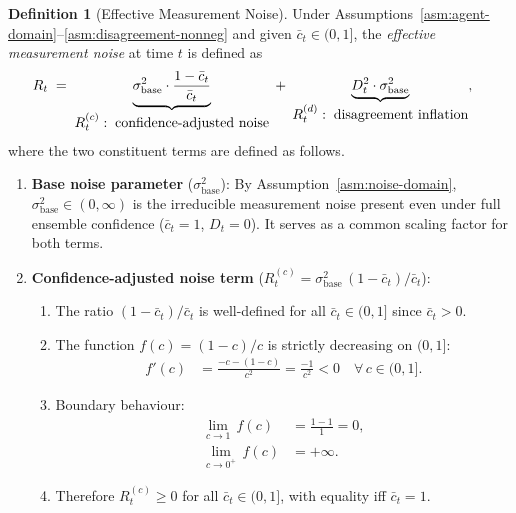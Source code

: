 \documentclass[12pt,openany]{book}
\numberwithin{equation}{chapter}
\theoremstyle{plain}
\theoremstyle{definition}
\newtheorem{definition}[theorem]{Definition}
\theoremstyle{remark}
\begin{document}
\begin{definition}[Effective Measurement Noise]
\label{def:effective-noise}
Under Assumptions~\ref{asm:agent-domain}--\ref{asm:disagreement-nonneg}
and given $\bar{c}_t \in (0, 1]$, the
\emph{effective measurement noise} at time $t$ is defined as
\begin{align}
  R_t
  &\;=\;
  \underbrace{%
    \sigma_{\mathrm{base}}^2
    \cdot
    \frac{1 - \bar{c}_t}{\bar{c}_t}
  }_{\displaystyle R_t^{(c)}:\;\text{confidence-adjusted noise}}
  \;+\;
  \underbrace{%
    D_t^2
    \cdot
    \sigma_{\mathrm{base}}^2
  }_{\displaystyle R_t^{(d)}:\;\text{disagreement inflation}},
  \label{eq:effective-measurement-noise}
\end{align}
where the two constituent terms are defined as follows.
\begin{enumerate}
  \item \textbf{Base noise parameter} ($\sigma_{\mathrm{base}}^2$):
        By Assumption~\ref{asm:noise-domain},
        $\sigma_{\mathrm{base}}^2 \in (0,\infty)$ is the
        irreducible measurement noise present even under full
        ensemble confidence ($\bar{c}_t = 1$, $D_t = 0$).
        It serves as a common scaling factor for both terms.

  \item \textbf{Confidence-adjusted noise term}
        ($R_t^{(c)} = \sigma_{\mathrm{base}}^2\,
        (1-\bar{c}_t)/\bar{c}_t$):
        \begin{enumerate}
          \item The ratio $(1-\bar{c}_t)/\bar{c}_t$ is
                well-defined for all $\bar{c}_t \in (0,1]$
                since $\bar{c}_t > 0$.
          \item The function $f(c) = (1-c)/c$ is strictly
                decreasing on $(0,1]$:
                \begin{align}
                  f'(c)
                  &= \frac{-c - (1-c)}{c^2}
                   = \frac{-1}{c^2}
                   < 0
                   \quad \forall\, c \in (0,1].
                  \label{eq:f-derivative}
                \end{align}
          \item Boundary behaviour:
                \begin{align}
                  \lim_{c \to 1}\, f(c)
                  &= \frac{1-1}{1} = 0,
                  \label{eq:f-at-1} \\
                  \lim_{c \to 0^+}\, f(c)
                  &= +\infty.
                  \label{eq:f-at-0}
                \end{align}
          \item Therefore $R_t^{(c)} \geq 0$ for all
                $\bar{c}_t \in (0,1]$, with equality iff
                $\bar{c}_t = 1$.
        \end{enumerate}


\end{enumerate}
\end{definition}
\end{document}
